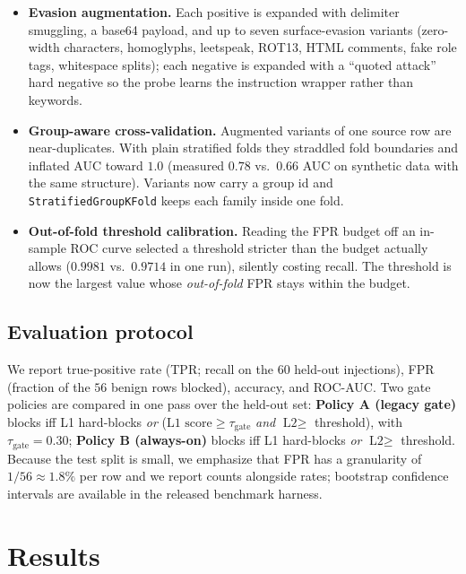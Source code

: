 \documentclass[conference]{IEEEtran}
\begin{document}
\begin{itemize}
  \item \textbf{Evasion augmentation.} Each positive is expanded with delimiter
        smuggling, a base64 payload, and up to seven surface-evasion variants
        (zero-width characters, homoglyphs, leetspeak, ROT13, HTML comments,
        fake role tags, whitespace splits); each negative is expanded with a
        ``quoted attack'' hard negative so the probe learns the instruction
        wrapper rather than keywords.
  \item \textbf{Group-aware cross-validation.} Augmented variants of one source
        row are near-duplicates. With plain stratified folds they straddled
        fold boundaries and inflated AUC toward $1.0$ (measured $0.78$ vs.\
        $0.66$ AUC on synthetic data with the same structure). Variants now
        carry a group id and \texttt{StratifiedGroupKFold} keeps each family
        inside one fold.
  \item \textbf{Out-of-fold threshold calibration.} Reading the FPR budget off
        an in-sample ROC curve selected a threshold stricter than the budget
        actually allows ($0.9981$ vs.\ $0.9714$ in one run), silently costing
        recall. The threshold is now the largest value whose
        \emph{out-of-fold} FPR stays within the budget.
\end{itemize}

\subsection{Evaluation protocol}
\label{sec:eval}
We report true-positive rate (TPR; recall on the $60$ held-out injections),
FPR (fraction of the $56$ benign rows blocked), accuracy, and ROC-AUC. Two
gate policies are compared in one pass over the held-out set:
\textbf{Policy A (legacy gate)} blocks iff L1 hard-blocks \emph{or}
($\text{L1 score} \ge \tau_{\text{gate}}$ \emph{and} $\text{L2} \ge$ threshold),
with $\tau_{\text{gate}} = 0.30$; \textbf{Policy B (always-on)} blocks iff L1
hard-blocks \emph{or} $\text{L2} \ge$ threshold. Because the test split is
small, we emphasize that FPR has a granularity of $1/56 \approx 1.8\%$ per row
and we report counts alongside rates; bootstrap confidence intervals are
available in the released benchmark harness.

\section{Results}
\label{sec:results}
\end{document}
